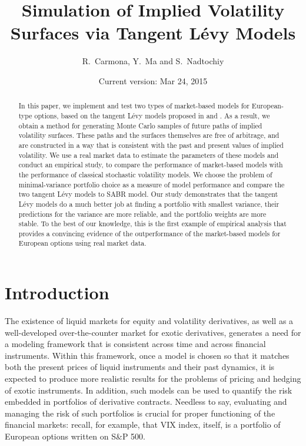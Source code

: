 \documentclass{article}
\numberwithin{equation}{section}
\begin{document}
\title{\textbf{Simulation of Implied Volatility Surfaces via Tangent L\'{e}vy Models}}
\author{R.~Carmona, Y.~Ma and S.~Nadtochiy}
\date{Current version: Mar 24, 2015}

\maketitle

\begin{abstract}
In this paper, we implement and test two types of market-based models for European-type options, based on the tangent L\'evy models proposed in \cite{carmona2010tangentlevy} and \cite{carmona2011tangentlevy}. As a result, we obtain a method for generating Monte Carlo samples of future paths of implied volatility surfaces. These paths and the surfaces themselves are free of arbitrage, and are constructed in a way that is consistent with the past and present values of implied volatility.
We use a real market data to estimate the parameters of these models and conduct an empirical study, to compare the performance of market-based models with the performance of classical stochastic volatility models. We choose the problem of minimal-variance portfolio choice as a measure of model performance and compare the two tangent L\'evy models to SABR model. Our study demonstrates that the tangent L\'{e}vy models do a much better job at finding a portfolio with smallest variance, their predictions for the variance are more reliable, and the portfolio weights are more stable. To the best of our knowledge, this is the first example of empirical analysis that provides a convincing evidence of the outperformance of the market-based models for European options using real market data.
\end{abstract}




\section{Introduction\label{se:intro}}


The existence of liquid markets for equity and volatility derivatives, as well as a well-developed over-the-counter market for exotic derivatives, generates a need for a modeling framework that is consistent across time and across financial instruments. Within this framework, once a model is chosen so that it matches both the present prices of liquid instruments and their past dynamics, it is expected to produce more realistic results for the problems of pricing and hedging of exotic instruments. In addition, such models can be used to quantify the risk embedded in portfolios of derivative contracts. Needless to say, evaluating and managing the risk of such portfolios is crucial for proper functioning of the financial markets: recall, for example, that VIX index, itself, is a portfolio of European options written on S\&P 500.
\end{document}
